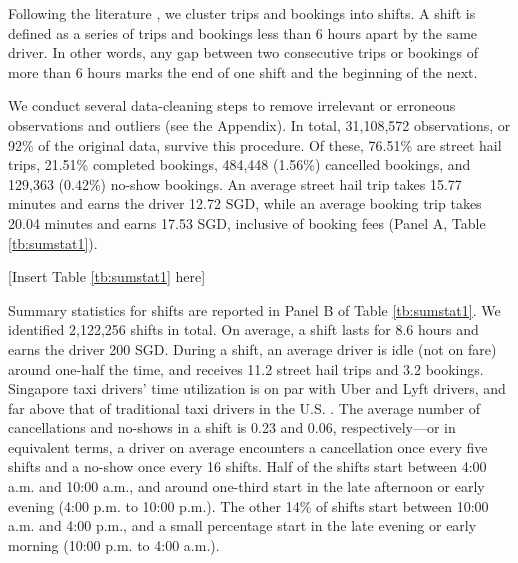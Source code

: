 \documentclass[reviewmode]{restud}
\begin{document}
Following the literature \citep{farber2015you,agarwal2015singaporean,martin2017quit,chen2015dynamic}, we cluster trips and bookings into shifts. A shift is defined as a series of trips and bookings less than 6 hours apart by the same driver. In other words, any gap between two consecutive trips or bookings of more than 6 hours marks the end of one shift and the beginning of the next. 

We conduct several data-cleaning steps to remove irrelevant or erroneous observations and outliers (see the Appendix).
In total, 31,108,572 observations, or 92\% of the original data, survive this procedure. Of these, 76.51\% are street hail trips, 21.51\% completed bookings, 484,448 (1.56\%) cancelled bookings, and 129,363 (0.42\%) no-show bookings. An average street hail trip takes 15.77 minutes and earns the driver 12.72 SGD, while an average  booking trip takes 20.04 minutes and earns 17.53 SGD, inclusive of booking fees (Panel A, Table \ref{tb:sumstat1}).


\begin{center}
	[Insert Table \ref{tb:sumstat1} here]
\end{center}


Summary statistics for shifts are reported in Panel B of Table \ref{tb:sumstat1}. We identified 2,122,256 shifts in total. On average, a shift lasts for 8.6 hours and earns the driver 200 SGD. During a shift, an average driver is idle (not on fare) around one-half the time, and receives 11.2 street hail trips and 3.2 bookings.  Singapore taxi drivers' time utilization is on par with Uber and Lyft drivers, and far above that of traditional taxi drivers in the U.S. \citep{cramer2016disruptive}. The average number of cancellations and no-shows in a shift is 0.23 and 0.06, respectively---or in equivalent terms, a driver on average encounters a cancellation once every five shifts and a no-show once every 16 shifts. Half of the shifts start between 4:00 a.m. and 10:00 a.m., and around one-third start in the late afternoon or early evening (4:00 p.m. to 10:00 p.m.). The other 14\% of shifts start between 10:00 a.m. and 4:00 p.m., and a small percentage start in the late evening or early morning (10:00 p.m. to 4:00 a.m.).
\end{document}

